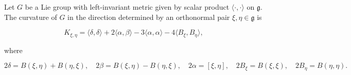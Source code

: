 Let $G$ be a Lie group with left-invariant metric given by scalar product $\langle \cdot, \cdot \rangle$ on $\mathfrak{g}$. The curvature of $G$ in the direction determined by an orthonormal pair $\xi, \eta \in \mathfrak{g}$ is

$$K_{\xi, \eta} = \langle \delta, \delta \rangle + 2\langle \alpha, \beta \rangle - 3\langle \alpha, \alpha \rangle - 4\langle B_\xi, B_\eta \rangle,$$

where

$$2\delta = B(\xi, \eta) + B(\eta, \xi), \quad 2\beta = B(\xi, \eta) - B(\eta, \xi), \quad 2\alpha = [\xi, \eta], \quad 2B_\xi = B(\xi, \xi), \quad 2B_\eta = B(\eta, \eta).$$
